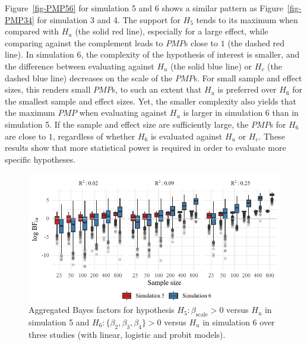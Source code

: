 \documentclass[
]{article}
\begin{document}
Figure~\ref{fig-PMP56} for simulation 5 and 6 shows a similar pattern as
Figure~\ref{fig-PMP34} for simulation 3 and 4. The support for \(H_5\)
tends to its maximum when compared with \(H_u\) (the solid red line),
especially for a large effect, while comparing against the complement
leads to \(PMP\)s close to \(1\) (the dashed red line). In simulation 6,
the complexity of the hypothesis of interest is smaller, and the
difference between evaluating against \(H_u\) (the solid blue line) or
\(H_c\) (the dashed blue line) decreases on the scale of the \(PMP\)s.
For small sample and effect sizes, this renders small \(PMP\)s, to such
an extent that \(H_u\) is preferred over \(H_6\) for the smallest sample
and effect sizes. Yet, the smaller complexity also yields that the
maximum \(PMP\) when evaluating against \(H_u\) is larger in simulation
6 than in simulation 5. If the sample and effect size are sufficiently
large, the \(PMP\)s for \(H_6\) are close to \(1\), regardless of
whether \(H_6\) is evaluated against \(H_u\) or \(H_c\). These results
show that more statistical power is required in order to evaluate more
specific hypotheses.

\begin{figure}[!t]

{\centering \includegraphics[width=1\textwidth,height=\textheight]{manuscript_VK_files/figure-pdf/fig-BF56-1.pdf}

}

\caption{\label{fig-BF56}Aggregated Bayes factors for hypothesis
\(H_5: \beta_{\text{scale}} > 0\) versus \(H_u\) in simulation 5 and
\(H_6: \{\beta_2, \beta_3, \beta_4\} > 0\) versus \(H_u\) in simulation
6 over three studies (with linear, logistic and probit models).}

\end{figure}
\end{document}
